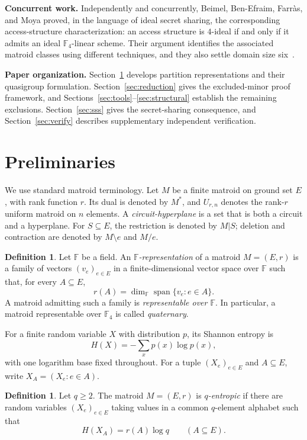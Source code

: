 \documentclass[preprint,12pt]{elsarticle}
\theoremstyle{definition}
\newtheorem{definition}[theorem]{Definition}
\newcommand{\F}{\mathbb F}
\begin{document}
\noindent\textbf{Concurrent work.}\quad
Independently and concurrently, Beimel, Ben-Efraim, Farr\`as, and Moya proved,
in the language of ideal secret sharing, the corresponding access-structure
characterization: an access structure is $4$-ideal if and only if it admits an
ideal $\F_4$-linear scheme. Their argument identifies the associated matroid
classes using different techniques, and they also settle domain size
six~\cite{BeimelBenEfraimFarrasMoya2026}.

\noindent\textbf{Paper organization.}\quad
Section~\ref{sec:fixed} develops partition representations and their
quasigroup formulation. Section~\ref{sec:reduction} gives the excluded-minor
proof framework, and Sections~\ref{sec:tools}--\ref{sec:structural} establish
the remaining exclusions. Section~\ref{sec:sss} gives the secret-sharing
consequence, and Section~\ref{sec:verify} describes supplementary independent
verification.

\section{\texorpdfstring{Preliminaries}{Preliminaries}}\label{sec:fixed}

We use standard matroid terminology. Let $M$ be a finite matroid on ground set $E$, with rank function $r$. Its dual is denoted by $M^*$, and $U_{r,n}$ denotes the rank-$r$ uniform matroid on $n$ elements. A \emph{circuit-hyperplane} is a set that is both a circuit and a hyperplane. For $S\subseteq E$, the restriction is denoted by $M|S$; deletion and contraction are denoted by $M\setminus e$ and $M/e$.

\begin{definition}
Let $\mathbb F$ be a field. An \emph{$\mathbb F$-representation}
of a matroid $M=(E,r)$ is a family of vectors $(v_e)_{e\in E}$ in a
finite-dimensional vector space over $\mathbb F$ such that, for every
$A\subseteq E$,
\[
r(A)=\dim_{\mathbb F}\operatorname{span}\{v_e:e\in A\}.
\]
A matroid admitting such a family is \emph{representable over $\mathbb F$}.
In particular, a matroid representable over $\mathbb F_4$ is called
\emph{quaternary}.
\end{definition}

For a finite random variable $X$ with distribution $p$, its Shannon entropy is
\[
H(X)=-\sum_x p(x)\log p(x),
\]
with one logarithm base fixed throughout. For a tuple $(X_e)_{e\in E}$ and $A\subseteq E$, write $X_A=(X_e:e\in A)$.

\begin{definition}
Let $q\ge2$. The matroid $M=(E,r)$ is \emph{$q$-entropic} if there are random variables $(X_e)_{e\in E}$ taking values in a common $q$-element alphabet such that
\[
H(X_A)=r(A)\log q\qquad(A\subseteq E).
\]
\end{definition}
\end{document}
